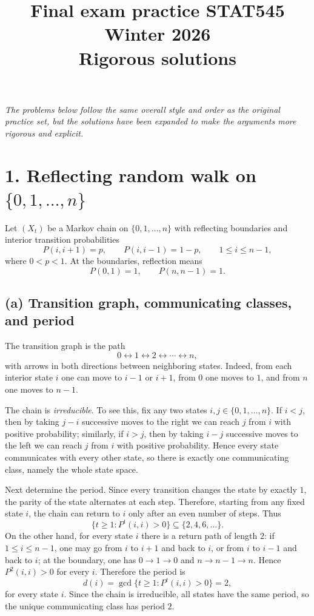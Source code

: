\documentclass[11pt]{article}
\title{Final exam practice STAT545 Winter 2026\\Rigorous solutions}
\date{}
\begin{document}
\maketitle

\textit{The problems below follow the same overall style and order as the original practice set, but the solutions have been expanded to make the arguments more rigorous and explicit.}

\section*{1. Reflecting random walk on $\{0,1,\dots,n\}$}

Let $(X_t)$ be a Markov chain on $\{0,1,\dots,n\}$ with reflecting boundaries and interior transition probabilities
\[
P(i,i+1)=p,\qquad P(i,i-1)=1-p,\qquad 1\le i\le n-1,
\]
where $0<p<1$. At the boundaries, reflection means
\[
P(0,1)=1,\qquad P(n,n-1)=1.
\]

\subsection*{(a) Transition graph, communicating classes, and period}
The transition graph is the path
\[
0 \leftrightarrow 1 \leftrightarrow 2 \leftrightarrow \cdots \leftrightarrow n,
\]
with arrows in both directions between neighboring states. Indeed, from each interior state $i$ one can move to $i-1$ or $i+1$, from $0$ one moves to $1$, and from $n$ one moves to $n-1$.

The chain is \emph{irreducible}. To see this, fix any two states $i,j\in\{0,1,\dots,n\}$. If $i<j$, then by taking $j-i$ successive moves to the right we can reach $j$ from $i$ with positive probability; similarly, if $i>j$, then by taking $i-j$ successive moves to the left we can reach $j$ from $i$ with positive probability. Hence every state communicates with every other state, so there is exactly one communicating class, namely the whole state space.

Next determine the period. Since every transition changes the state by exactly $1$, the parity of the state alternates at each step. Therefore, starting from any fixed state $i$, the chain can return to $i$ only after an even number of steps. Thus
\[
\{t\ge 1:P^t(i,i)>0\}\subseteq \{2,4,6,\dots\}.
\]
On the other hand, for every state $i$ there is a return path of length $2$: if $1\le i\le n-1$, one may go from $i$ to $i+1$ and back to $i$, or from $i$ to $i-1$ and back to $i$; at the boundary, one has $0\to1\to0$ and $n\to n-1\to n$. Hence $P^2(i,i)>0$ for every $i$. Therefore the period is
\[
d(i)=\gcd\{t\ge1:P^t(i,i)>0\}=2,
\]
for every state $i$. Since the chain is irreducible, all states have the same period, so the unique communicating class has period $2$.
\end{document}
